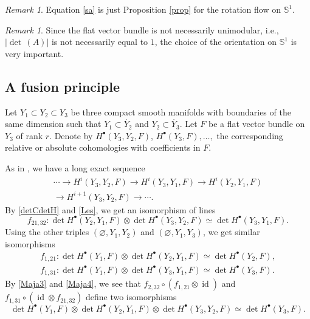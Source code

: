 \documentclass[11pt]{article}
\newcommand{\ie}{i.e.,\xspace}
\numberwithin{equation}{section}
\newcommand{\sbullet}{{\scriptscriptstyle\bullet}}
\theoremstyle{plain}
\theoremstyle{definition}
\theoremstyle{remark}
\newtheorem{re}[lem]{Remark}
\newcommand{\bbS}{\mathbb{S}}
\DeclareMathOperator{\id}{id}
\begin{document}
\begin{re}
Equation \eqref{sa} is just Proposition \ref{prop} for the rotation flow on $\bbS^{1}$.
\end{re}

\begin{re}
Since the flat vector bundle is not necessarily unimodular, \ie $|{\det\,}(A)|$ is
not necessarily equal to $1$, the choice of the
orientation on $\bbS^{1}$ is very important.
\end{re}

\subsection{A fusion principle}\label{Fp}
Let $Y_{1}\subset Y_{2}\subset Y_{3}$ be three compact smooth
manifolds with boundaries of
the same dimension such that $Y_{1}\subset \mathring{Y_{2}}$ and
$Y_{2}\subset \mathring{Y_{3}}$. Let $F$ be a flat vector bundle on
$Y_{3}$ of rank $r$. Denote by $H^{\sbullet}(Y_{3},Y_{2},F)$,
$H^{\sbullet}(Y_{3},F), \ldots,$ the corresponding relative or absolute
cohomologies with coefficients in $F$.

As in \cite[(0.16)]{BruningMa_2012}, we have a long exact sequence
\begin{multline}\label{Les}
\cdots\to H^{i}(Y_{3},Y_{2},F)\to H^{i}(Y_{3},Y_{1},F)\to
H^{i}(Y_{2},Y_{1},F)\\
\to H^{i+1}(Y_{3},Y_{2},F) \to \cdots.
\end{multline}
By \eqref{detCdetH} and \eqref{Les}, we get an isomorphism of lines
\begin{equation}\label{Maja3}
f_{21,32 }:\det H^{\sbullet}(Y_{2},Y_{1},F)\otimes \det H^{\sbullet}(Y_{3},Y_{2},F)\simeq \det H^{\sbullet}(Y_{3},Y_{1},F).
\end{equation}
Using the other triples $(\varnothing,Y_{1},Y_{2})$ and
$(\varnothing,Y_{1},Y_{3})$, we get similar isomorphisms
\begin{equation}\label{Maja4}
\begin{aligned}
f_{1,21}: \det H^{\sbullet}(Y_{1},F)\otimes \det
H^{\sbullet}(Y_{2},Y_{1},F)\simeq \det H^{\sbullet}(Y_{2},F),\\
f_{1,31}: \det H^{\sbullet}(Y_{1},F)\otimes \det
H^{\sbullet}(Y_{3},Y_{1},F)\simeq \det H^{\sbullet}(Y_{3},F).
\end{aligned}
\end{equation}
By \eqref{Maja3} and \eqref{Maja4}, we see that
$f_{2,32}\circ(f_{1,21}\otimes\id) $ and $f_{1,31}\circ (\id \otimes f_{21,32})$
define two isomorphisms
\begin{equation}\label{FYYY}
\det H^{\sbullet}(Y_{1},F)\otimes \det H^{\sbullet}(Y_{2},Y_{1},F)\otimes \det
H^{\sbullet}(Y_{3},Y_{2},F) \simeq \det H^{\sbullet}(Y_{3},F).
\end{equation}
\end{document}
